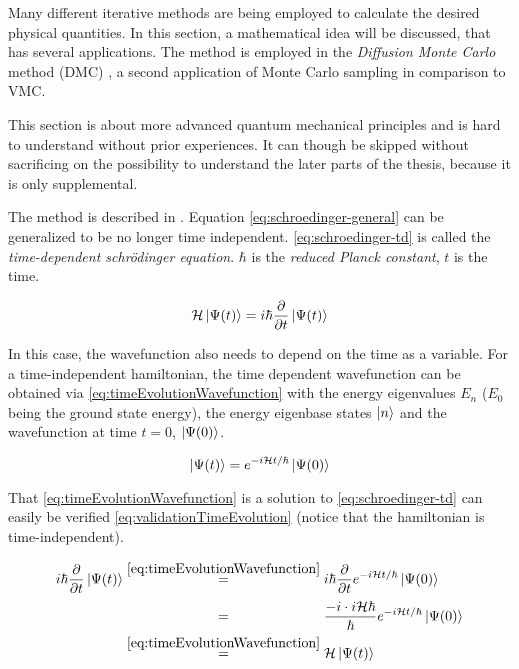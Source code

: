 Many different iterative methods are being employed to calculate the desired physical quantities.
In this section, a mathematical idea will be discussed, that has several applications.
The method is employed in the \emph{Diffusion Monte Carlo} method (DMC) \cite{quantumMonteCarloSimulationsOfSolids}, a second application of Monte Carlo sampling in comparison to VMC.

This section is about more advanced quantum mechanical principles and is hard to understand without prior experiences. It can though be skipped without sacrificing on the possibility to understand the later parts of the thesis, because it is only supplemental.

The method is described in \cite{imagenarySchroedingerEquation}.
Equation \ref{eq:schroedinger-general} can be generalized to be no longer time independent. 
\ref{eq:schroedinger-td} is called the \emph{time-dependent schrödinger equation}. $\hbar$ is the \emph{reduced Planck constant}, $t$ is the time.

\begin{equation}
    \label{eq:schroedinger-td}
    \mathcal{H} \ket{\Psi(t)} = i\hbar \frac{\partial }{\partial t} \ket{\Psi(t)}
\end{equation}

In this case, the wavefunction also needs to depend on the time as a variable.
For a time-independent hamiltonian, the time dependent wavefunction can be obtained via \ref{eq:timeEvolutionWavefunction} \cite{schwablQM} with the energy eigenvalues $E_n$ ($E_0$ being the ground state energy), the energy eigenbase states $\ket{n}$ and the wavefunction at time $t=0$, $\ket{\Psi(0)}$.

\begin{equation}
    \label{eq:timeEvolutionWavefunction}
        \ket{\Psi(t)} = e^{-i\mathcal{H} t / \hbar} \ket{\Psi(0)}
\end{equation}

That \ref{eq:timeEvolutionWavefunction} is a solution to \ref{eq:schroedinger-td} can easily be verified \ref{eq:validationTimeEvolution} (notice that the hamiltonian is time-independent).

\begin{equation}
    \label{eq:validationTimeEvolution}
    \begin{split}
        i\hbar \frac{\partial }{\partial t} \ket{\Psi(t)} &\stackrel{\ref{eq:timeEvolutionWavefunction}}{=} 
        i\hbar \frac{\partial }{\partial t}  e^{-i\hamiltonian t / \hbar} \ket{\Psi(0)}\\
        &\stackrel{\phantom{\ref{eq:timeEvolutionWavefunction}}}{=} \frac{-i\cdot i \hamiltonian \hbar}{\hbar} e^{-i\hamiltonian t / \hbar} \ket{\Psi(0)}\\
        &\stackrel{\ref{eq:timeEvolutionWavefunction}}{=} \hamiltonian \ket{\Psi(t)}
    \end{split}
\end{equation}

